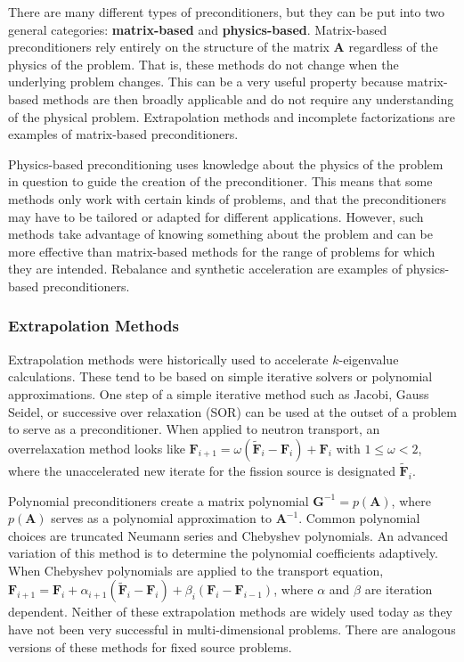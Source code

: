 \documentclass[12pt]{article}
\newcommand{\ve}[1]{\ensuremath{\mathbf{#1}}}
\begin{document}
There are many different types of preconditioners, but they can be put into two general categories: \textbf{matrix-based} and \textbf{physics-based}. Matrix-based preconditioners rely entirely on the structure of the matrix $\ve{A}$ regardless of the physics of the problem. That is, these methods do not change when the underlying problem changes. This can be a very useful property because matrix-based methods are then broadly applicable and do not require any understanding of the physical problem. Extrapolation methods and incomplete factorizations are examples of matrix-based preconditioners.%

Physics-based preconditioning uses knowledge about the physics of the problem in question to guide the creation of the preconditioner. This means that some methods only work with certain kinds of problems, and that the preconditioners may have to be tailored or adapted for different applications. However, such methods take advantage of knowing something about the problem and can be more effective than matrix-based methods for the range of problems for which they are intended. Rebalance and synthetic acceleration are examples of physics-based preconditioners.%


\subsubsection*{Extrapolation Methods}
Extrapolation methods were historically used to accelerate $k$-eigenvalue calculations. These tend to be based on simple iterative solvers or polynomial approximations. One step of a simple iterative method such as Jacobi, Gauss Seidel, or successive over relaxation (SOR) can be used at the outset of a problem to serve as a preconditioner. %
When applied to neutron transport, an overrelaxation method looks like $\ve{F}_{i+1} = \omega(\tilde{\ve{F}}_i - \ve{F}_i) + \ve{F}_i$ with $1 \le \omega < 2$, where the unaccelerated new iterate for the fission source is designated $\tilde{\ve{F}}_i$.%

Polynomial preconditioners create a matrix polynomial $\ve{G}^{-1} = p(\ve{A})$, where $p(\ve{A})$ serves as a polynomial approximation to $\ve{A}^{-1}$. Common polynomial choices are truncated Neumann series and Chebyshev polynomials. An advanced variation of this method is to determine the polynomial coefficients adaptively. %
When Chebyshev polynomials are applied to the transport equation, $\ve{F}_{i+1} = \ve{F}_i + \alpha_{i+1}(\tilde{\ve{F}}_i - \ve{F}_i) + \beta_i(\ve{F}_i - \ve{F}_{i-1})$, where $\alpha$ and $\beta$ are iteration dependent. %
Neither of these extrapolation methods are widely used today as they have not been very successful in multi-dimensional problems. There are analogous versions of these methods for fixed source problems.%
\end{document}
